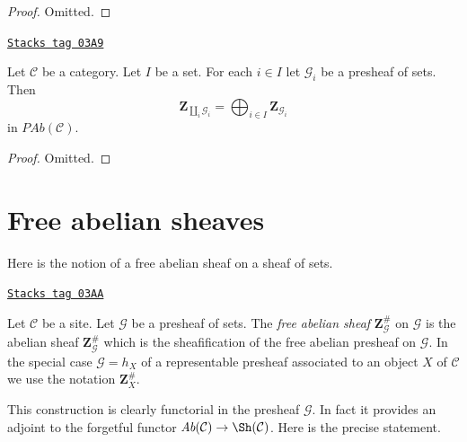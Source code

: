\begin{proof}
Omitted.
\end{proof}

\begin{lemma}
\label{sites-modules-lemma-coproduct-sum-free-abelian-presheaf}
\href{https://stacks.math.columbia.edu/tag/03A9}{\texttt{Stacks tag 03A9}}

Let $\mathcal{C}$ be a category.
Let $I$ be a set. For each $i \in I$ let
$\mathcal{G}_i$ be a presheaf of sets.
Then
$$
\mathbf{Z}_{\coprod_i \mathcal{G}_i}
=
\bigoplus\nolimits_{i \in I} \mathbf{Z}_{\mathcal{G}_i}
$$
in $\textit{PAb}(\mathcal{C})$.
\end{lemma}

\begin{proof}
Omitted.
\end{proof}

\section{Free abelian sheaves}
\label{sites-modules-section-free-abelian-sheaf}
Here is the notion of a free abelian sheaf on a sheaf of sets.

\begin{definition}
\label{sites-modules-definition-free-abelian-sheaf-on}
\href{https://stacks.math.columbia.edu/tag/03AA}{\texttt{Stacks tag 03AA}}

Let $\mathcal{C}$ be a site. Let $\mathcal{G}$ be a presheaf of sets.
The {\it free abelian sheaf} $\mathbf{Z}_\mathcal{G}^\#$
on $\mathcal{G}$ is the abelian sheaf $\mathbf{Z}_\mathcal{G}^\#$
which is the sheafification of the free abelian presheaf on $\mathcal{G}$.
In the special case $\mathcal{G} = h_X$ of a representable presheaf
associated to an object $X$ of $\mathcal{C}$
we use the notation $\mathbf{Z}_X^\#$.
\end{definition}

This construction is clearly functorial in the presheaf $\mathcal{G}$.
In fact it provides an adjoint to the forgetful functor
$\textit{Ab}(\mathcal{C}) \to \Sh(\mathcal{C})$.
Here is the precise statement.


